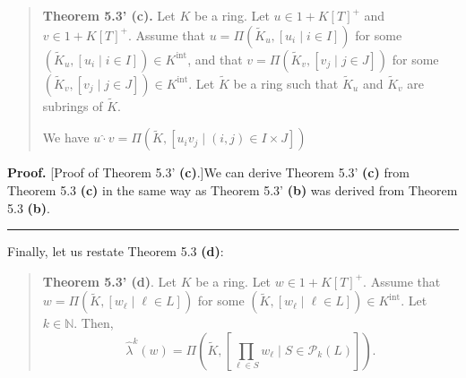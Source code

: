 \documentclass[numbers=enddot,12pt,final,onecolumn,notitlepage]{scrartcl}%
\newenvironment{proof}[1][Proof]{\noindent\textbf{#1.} }{\ \rule{0.5em}{0.5em}}
\begin{document}
\begin{quote}
\textbf{Theorem 5.3' (c).} Let $K$ be a ring. Let $u\in1+K\left[  T\right]
^{+}$ and $v\in1+K\left[  T\right]  ^{+}$. Assume that $u=\Pi\left(
\widetilde{K}_{u},\left[  u_{i}\mid i\in I\right]  \right)  $ for some
$\left(  \widetilde{K}_{u},\left[  u_{i}\mid i\in I\right]  \right)  \in
K^{\operatorname*{int}}$, and that $v=\Pi\left(  \widetilde{K}_{v},\left[
v_{j}\mid j\in J\right]  \right)  $ for some $\left(  \widetilde{K}%
_{v},\left[  v_{j}\mid j\in J\right]  \right)  \in K^{\operatorname*{int}}$.
Let $\widetilde{K}$ be a ring such that $\widetilde{K}_{u}$ and $\widetilde{K}%
_{v}$ are subrings of $\widetilde{K}$.

We have $u\widehat{\cdot}v=\Pi\left(  \widetilde{K},\left[  u_{i}v_{j}%
\mid\left(  i,j\right)  \in I\times J\right]  \right)  $
\end{quote}

\begin{proof}
[Proof of Theorem 5.3' \textbf{(c)}.]We can derive Theorem 5.3' \textbf{(c)}
from Theorem 5.3 \textbf{(c)} in the same way as Theorem 5.3' \textbf{(b)} was
derived from Theorem 5.3 \textbf{(b)}.
\end{proof}

Finally, let us restate Theorem 5.3 \textbf{(d)}:

\begin{quote}
\textbf{Theorem 5.3' (d)}. Let $K$ be a ring. Let $w\in1+K\left[  T\right]
^{+}$. Assume that $w=\Pi\left(  \widetilde{K},\left[  w_{\ell}\mid\ell\in
L\right]  \right)  $ for some $\left(  \widetilde{K},\left[  w_{\ell}\mid
\ell\in L\right]  \right)  \in K^{\operatorname*{int}}$. Let $k\in\mathbb{N}$.
Then,%
\[
\widehat{\lambda}^{k}\left(  w\right)  =\Pi\left(  \widetilde{K},\left[
\prod_{\ell\in S}w_{\ell}\mid S\in\mathcal{P}_{k}\left(  L\right)  \right]
\right)  .
\]



\end{quote}
\end{document}
